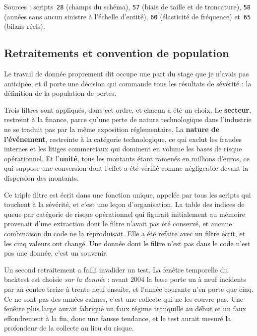 \documentclass[12pt,a4paper]{article}
\theoremstyle{definition}
\begin{document}
\vspace{4pt}
\noindent Sources : scripts~\texttt{28} (champs du schéma), \texttt{57} (biais de
taille et de troncature), \texttt{58} (années sans aucun sinistre à l'échelle
d'entité), \texttt{60} (élasticité de fréquence) et~\texttt{65} (bilans réels).

\subsection{Retraitements et convention de population}
\label{ss:retraitements}

Le travail de donnée proprement dit occupe une part du stage que je n'avais pas
anticipée, et il porte une décision qui commande tous les résultats de sévérité :
la définition de la population de pertes.

Trois filtres sont appliqués, dans cet ordre, et chacun a été un choix. Le
\textbf{secteur}, restreint à la finance, parce qu'une perte de nature
technologique dans l'industrie ne se traduit pas par la même exposition
réglementaire. La \textbf{nature de l'événement}, restreinte à la catégorie
technologique, ce qui exclut les fraudes internes et les litiges commerciaux qui
dominent en volume les bases de risque opérationnel. Et l'\textbf{unité}, tous les
montants étant ramenés en millions d'euros, ce qui suppose une conversion dont
l'effet a été vérifié comme négligeable devant la dispersion des montants.

Ce triple filtre est écrit dans une fonction unique, appelée par tous les scripts
qui touchent à la sévérité, et c'est une leçon d'organisation. La table des
indices de queue par catégorie de risque opérationnel qui figurait initialement au
mémoire provenait d'une extraction dont le filtre n'avait pas été conservé, et
aucune combinaison du code ne la reproduisait. Elle a été refaite avec un filtre
écrit, et les cinq valeurs ont changé. Une donnée dont le filtre n'est pas dans le
code n'est pas une donnée, c'est un souvenir.

Un second retraitement a failli invalider un test. La fenêtre temporelle du
backtest est choisie \emph{sur la donnée} : avant $2004$ la base porte un à neuf
incidents par an contre treize à trente-neuf ensuite, et l'année courante n'en
porte que cinq. Ce ne sont pas des années calmes, c'est une collecte qui ne les
couvre pas. Une fenêtre plus large aurait fabriqué un faux régime tranquille au
début et un faux effondrement à la fin, donc une fausse tendance, et le test
aurait mesuré la profondeur de la collecte au lieu du risque.
\end{document}
